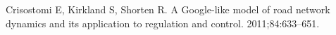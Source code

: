 \documentclass[twoside,twocolumn]{article}
\begin{document}

\begin{thebibliography}{99} %

Crisostomi E, Kirkland S, Shorten R. 
\newblock A Google-like model of road network dynamics and its application to regulation and control.
 2011;84:633--651.
 
\end{thebibliography}

\end{document}
